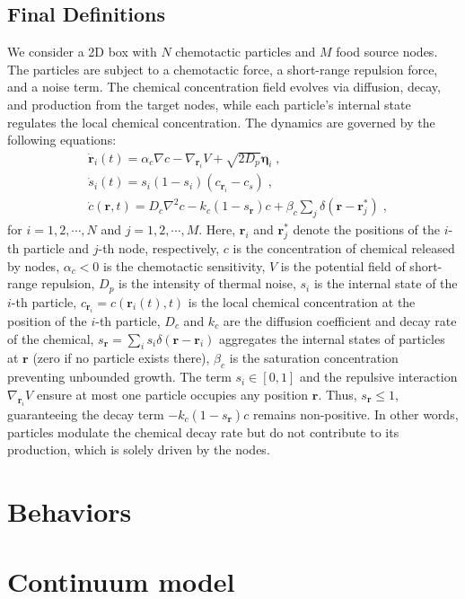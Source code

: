 \documentclass{article}
\begin{document}
\subsection{Final Definitions}
We consider a 2D box with $N$ chemotactic particles and $M$ food source nodes. The particles are subject to a chemotactic force, a short-range repulsion force, and a noise term. The chemical concentration field evolves via diffusion, decay, and production from the target nodes, while each particle’s internal state regulates the local chemical concentration. 
The dynamics are governed by the following equations:
\begin{subequations}
    \begin{align}
        &\dot{\mathbf{r}}_i\left( t \right) =\alpha _c\nabla c-\nabla _{\mathbf{r}_i}V+\sqrt{2D_p}\boldsymbol{\eta }_i \;,
        \\
        &\dot{s}_i\left( t \right) =s_i\left( 1-s_i \right) \left( c_{\mathbf{r}_i}-c_s \right) \;,
        \\
        &\dot{c}\left( \mathbf{r},t \right) = D_c\nabla ^2c-k_c\left( 1-s_{\mathbf{r}} \right) c+\beta _c\sum\nolimits_j^{}{\delta \left( \mathbf{r}-\mathbf{r}_{j}^{*} \right)} \;,
    \end{align}
    \label{eq:finalModel}
\end{subequations}
for $i=1,2,\cdots,N$ and $j=1,2,\cdots,M$. Here, $\mathbf{r}_i$ and $\mathbf{r}_j^*$ denote the positions of the $i$-th particle and $j$-th node, respectively, $c$ is the concentration of chemical released by nodes, $\alpha _c<0$ is the chemotactic sensitivity, $V$ is the potential field of short-range repulsion, $D_p$ is the intensity of thermal noise, $s_i$ is the internal state of the $i$-th particle, $c_{\mathbf{r}_i}=c\left( \mathbf{r}_i\left( t \right) ,t \right) $ is the local chemical concentration at the position of the $i$-th particle, $D_c$ and $k_c$ are the diffusion coefficient and decay rate of the chemical, $s_{\mathbf{r}}=\sum\nolimits_i^{}{s_i\delta \left( \mathbf{r}-\mathbf{r}_i \right)}$ aggregates the internal states of particles at $\mathbf{r}$ (zero if no particle exists there), $\beta _c$ is the saturation concentration preventing unbounded growth. 
The term $s_i\in \left[ 0,1 \right]$ and the repulsive interaction $\nabla _{\mathbf{r}_i}V$ ensure at most one particle occupies any position $\mathbf{r}$. Thus, $s_{\mathbf{r}} \leqslant 1$, guaranteeing the decay term $-k_c\left( 1-s_{\mathbf{r}} \right) c$ remains non-positive. In other words, particles modulate the chemical decay rate but do not contribute to its production, which is solely driven by the nodes.

\section{Behaviors}

\section{Continuum model}




\end{document}
